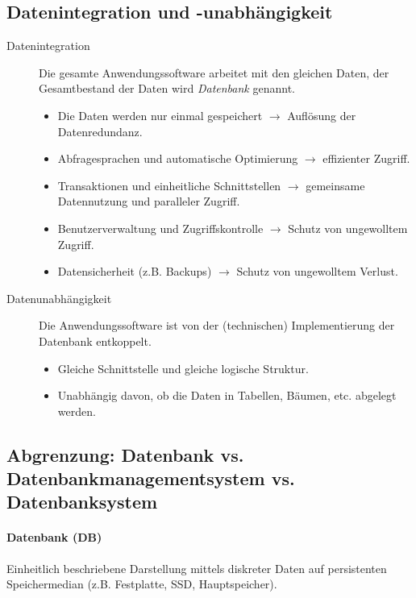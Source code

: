 \documentclass[a4paper, 11pt, accentcolor = tud3b]{tudreport}
\begin{document}
            \subsection{Datenintegration und -unabhängigkeit} %
	            \begin{description}
	            	\item[Datenintegration] Die gesamte Anwendungssoftware arbeitet mit den gleichen Daten, der Gesamtbestand der Daten wird \textit{Datenbank} genannt.
		            	\begin{itemize}
		            		\item Die Daten werden nur einmal gespeichert \(\rightarrow\) Auflösung der Datenredundanz.
		            		\item Abfragesprachen und automatische Optimierung \(\rightarrow\) effizienter Zugriff.
		            		\item Transaktionen und einheitliche Schnittstellen \(\rightarrow\) gemeinsame Datennutzung und paralleler Zugriff.
		            		\item Benutzerverwaltung und Zugriffskontrolle \(\rightarrow\) Schutz von ungewolltem Zugriff.
		            		\item Datensicherheit (z.B. Backups) \(\rightarrow\) Schutz von ungewolltem Verlust.
		            	\end{itemize}
		            \item[Datenunabhängigkeit] Die Anwendungssoftware ist von der (technischen) Implementierung der Datenbank entkoppelt.
			            \begin{itemize}
			            	\item Gleiche Schnittstelle und gleiche logische Struktur.
			            	\item Unabhängig davon, ob die Daten in Tabellen, Bäumen, etc. abgelegt werden.
			            \end{itemize}
            	\end{description}

            \subsection{Abgrenzung: Datenbank vs. Datenbankmanagementsystem vs. Datenbanksystem} %
                \paragraph{Datenbank (DB)}
	                Einheitlich beschriebene Darstellung mittels diskreter Daten auf persistenten Speichermedian (z.B. Festplatte, SSD, Hauptspeicher).
                
\end{document}
